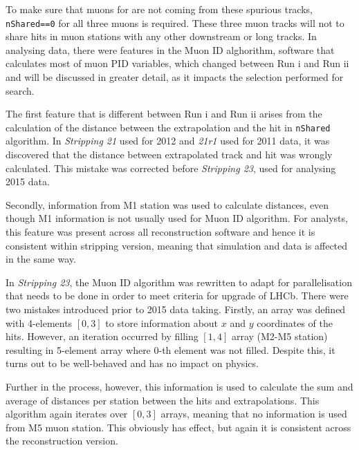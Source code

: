 To make sure that muons for \Bmumumu are not coming from these spurious tracks,  \texttt{nShared==0} for all three muons is required. These three muon tracks will not to share hits in muon stations with any other downstream or long tracks. In analysing data, there were features in the Muon ID alghorithm, software that calculates most of muon \gls{PID} variables, which changed between Run \Rn{1} and Run \Rn{2} and will be discussed in greater detail, as it impacts the selection performed for \Bmumumu search.

The first feature that is different between Run \Rn{1} and Run \Rn{2} arises from the calculation of the distance between the extrapolation and the hit in \texttt{nShared} algorithm.
In \textit{Stripping 21} used for 2012 and \textit{21r1} used for 2011 data, it was discovered that the distance between extrapolated track and hit was wrongly calculated. This mistake was corrected before \textit{Stripping 23}, used for analysing 2015 data. 

Secondly, information from M1 station was used to calculate distances, even though M1 information is not usually used for Muon ID algorithm.  For analysts, this feature was present across all reconstruction software and hence it is consistent within stripping version, meaning that simulation and data is affected in the same way.

In \textit{Stripping 23}, the Muon ID algorithm was rewritten to adapt for parallelisation that needs to be done in order to meet criteria for upgrade of \gls{LHCb}. There were two mistakes introduced prior to 2015 data taking.
Firstly, an array was defined with 4-elements $[0,3]$ to store information about $x$ and $y$ coordinates of the hits. However, an iteration occurred by filling $[1,4]$ array (M2-M5 station) resulting in 5-element array where 0-th element was not filled. Despite this, it turns out to be well-behaved and has no impact on physics.

Further in the process, however, this information is used to calculate the sum and average of distances per station between the hits and extrapolations. This algorithm again iterates over $[0,3]$ arrays, meaning that no information is used from M5 muon station. This obviously has effect, but again it is consistent across the reconstruction version.

